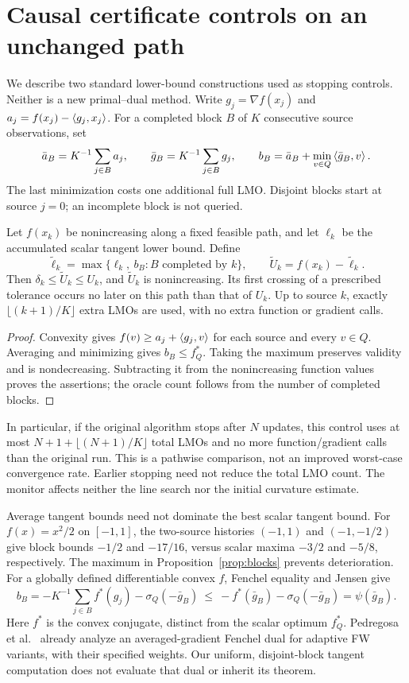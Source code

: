 \section{Causal certificate controls on an unchanged path}
\label{sec:tangentmonitors}
We describe two standard lower-bound constructions used as stopping
controls. Neither is a new primal--dual method. Write
$g_j=\nabla f(x_j)$ and $a_j=f(x_j)-\left\langle g_j,x_j\right\rangle$.
For a completed block $B$ of $K$ consecutive source observations, set
\[
 \bar a_B=K^{-1}\sum_{j\in B}a_j,\qquad
 \bar g_B=K^{-1}\sum_{j\in B}g_j,\qquad
 b_B=\bar a_B+\min_{v\in Q}\left\langle\bar g_B,v\right\rangle.
\]
The last minimization costs one additional full LMO. Disjoint blocks
start at source $j=0$; an incomplete block is not queried.

\begin{proposition}\label{prop:blocks}
Let $f(x_k)$ be nonincreasing along a fixed feasible path, and let $\ell_k$
be the accumulated scalar tangent lower bound. Define
\[
 \widetilde\ell_k=\max\{\ell_k,\ b_B:B\text{ completed by }k\},
 \qquad \widetilde U_k=f(x_k)-\widetilde\ell_k.
\]
Then $\delta_k\le\widetilde U_k\le U_k$, and
$\widetilde U_k$ is nonincreasing. Its first crossing of a prescribed
tolerance occurs no later on this path than that of $U_k$.
Up to source $k$, exactly $\lfloor(k+1)/K\rfloor$ extra LMOs are used,
with no extra function or gradient calls.
\end{proposition}
\begin{proof}
Convexity gives $f(v)\ge a_j+\left\langle g_j,v\right\rangle$ for each source and every
$v\in Q$. Averaging and minimizing gives $b_B\le f_Q^*$.
Taking the maximum preserves validity and is nondecreasing. Subtracting
it from the nonincreasing function values proves the assertions;
the oracle count follows from the number of completed blocks.
\end{proof}

In particular, if the original algorithm stops after $N$ updates, this
control uses at most $N+1+\lfloor(N+1)/K\rfloor$ total LMOs and no more
function/gradient calls than the original run. This is a pathwise
comparison, not an improved worst-case convergence rate. Earlier stopping
need not reduce the total LMO count. The monitor affects neither the
line search nor the initial curvature estimate.

Average tangent bounds need not dominate the best scalar tangent bound.
For $f(x)=x^2/2$ on $[-1,1]$, the two-source histories $(-1,1)$ and
$(-1,-1/2)$ give block bounds $-1/2$ and $-17/16$, versus scalar maxima
$-3/2$ and $-5/8$, respectively. The maximum in
Proposition~\ref{prop:blocks} prevents deterioration. For a globally
defined differentiable convex $f$, Fenchel equality and Jensen give
\[
 b_B=-K^{-1}\sum_{j\in B}f^*(g_j)-\sigma_Q(-\bar g_B)
 \ \le\ -f^*(\bar g_B)-\sigma_Q(-\bar g_B)=\psi(\bar g_B).
\]
Here $f^*$ is the convex conjugate, distinct from the scalar optimum
$f_Q^*$. Pedregosa et al.~\cite[Theorem 3]{pedregosa} already analyze an
averaged-gradient Fenchel dual for adaptive FW variants, with their
specified weights. Our uniform, disjoint-block tangent computation
does not evaluate that dual or inherit its theorem.

